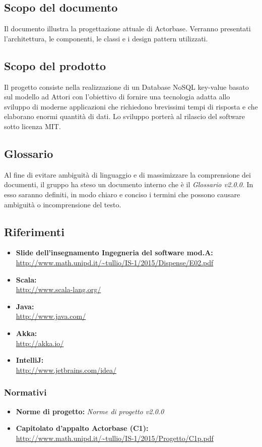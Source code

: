 \documentclass[a4paper]{article}
\begin{document}
	\subsection{Scopo del documento}
		Il documento illustra la progettazione attuale di Actorbase.
		Verranno presentati l'architettura, le componenti, le classi e i design pattern utilizzati.
	\subsection{Scopo del prodotto}
		Il progetto consiste nella realizzazione di un Database NoSQL key-value basato sul modello ad 
		Attori con l'obiettivo di fornire una tecnologia adatta allo sviluppo di moderne 
		applicazioni che richiedono brevissimi tempi di risposta e che elaborano enormi quantità 
		di dati. Lo sviluppo porterà al rilascio del software sotto licenza MIT.
	\subsection{Glossario}
		Al fine di evitare ambiguità di linguaggio e di massimizzare la comprensione dei documenti, il 
      gruppo ha steso un documento interno che è il \emph{Glossario v2.0.0}. In esso saranno definiti, in modo
      chiaro e conciso i termini che possono causare ambiguità o incomprensione del testo.
	\subsection{Riferimenti}
		\begin{itemize}
			\item \textbf{Slide dell'insegnamento Ingegneria del software mod.A:} \\
			\url{http://www.math.unipd.it/~tullio/IS-1/2015/Dispense/E02.pdf}
			\item \textbf{Scala:} \\
			\url{http://www.scala-lang.org/}
			\item \textbf{Java:} \\
			\url{http://www.java.com/}
			\item \textbf{Akka:} \\
			\url{http://akka.io/}
			\item \textbf{IntelliJ:} \\
			\url{http://www.jetbrains.com/idea/}
		\end{itemize}
	\subsubsection{Normativi}
		\begin{itemize}
			\item \textbf{Norme di progetto:} \emph{Norme di progetto v2.0.0}
			\item \textbf{Capitolato d'appalto Actorbase (C1):} \\ 
			\url{http://www.math.unipd.it/~tullio/IS-1/2015/Progetto/C1p.pdf}
		\end{itemize}
		
\end{document}
